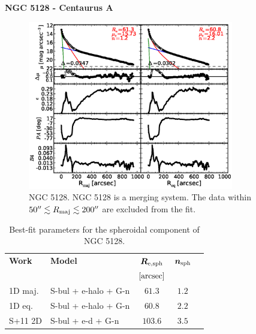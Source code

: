 \documentclass[preprint2]{emulateapj}
\newcommand{\fitfigurewidth}{0.8\textwidth}
\begin{document}
  \clearpage\newpage\noindent

  {\bf NGC 5128 - Centaurus A \\}

  \begin{figure}[h]
  \begin{center}
  \includegraphics[width=\fitfigurewidth]{images/n5128_1Dfit.eps}
  \caption{NGC 5128.
  NGC 5128 is a merging system. 
  The data within $50'' \lesssim R_{\rm maj} \lesssim 200''$ are excluded from the fit.}
  \end{center}
  \end{figure}

  \begin{table}[h]
  \small
  \caption{Best-fit parameters for the spheroidal component of NGC 5128.}
  \begin{center}
  \begin{tabular}{llccc}
  \hline
  {\bf Work} & {\bf Model}   & $\bm R_{\rm e,sph}$    & $\bm n_{\rm sph}$ \\
    &  &  $[\rm arcsec]$ & \\
  \hline
  1D maj. & S-bul + e-halo + G-n & $61.3$  &  $1.2$ \\
  1D eq.  & S-bul + e-halo + G-n & $60.8$  &  $2.2$ \\
  \hline
  S+11 2D         & S-bul + e-d + G-n    & $103.6$  &  $3.5$ \\
  \hline
  \end{tabular}
  \end{center}
  \label{tab:n5128}
  \end{table}
\end{document}
